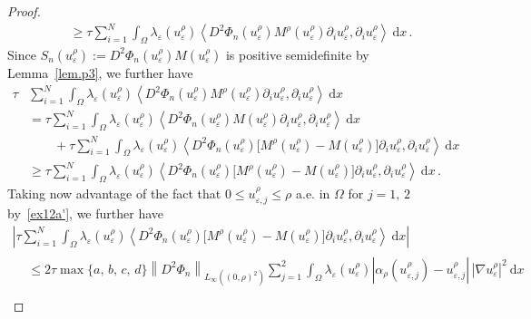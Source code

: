 \documentclass[AHL,Unicode,longabstracts,published]{cedram}
\newcommand{\rmd}{\mathrm{d}}
\begin{document}
\begin{proof}
\begin{equation}
\begin{split}
&\geq \tau \sum_{i=1}^N\int_\Omega\lambda_\varepsilon(u_\varepsilon^\rho) \left\langle D^2\Phi_n(u_\varepsilon^\rho) M^\rho(u_\varepsilon^\rho) \partial_i u_{\varepsilon}^\rho, \partial _i u_\varepsilon^\rho\right\rangle\ \rmd x\,. 
\end{split}
\end{equation}
\endgroup
Since $S_n(u_\varepsilon^\rho) := D^2\Phi_n(u_\varepsilon^\rho) M(u_\varepsilon^\rho)$ is positive semidefinite by Lemma~\ref{lem.p3}, we further have
\begin{equation}\label{pro4}
\begin{split}
\tau &\sum_{i=1}^N\int_\Omega \lambda_\varepsilon(u_\varepsilon^\rho) \left\langle D^2\Phi_n(u_\varepsilon^\rho) M^\rho(u_\varepsilon^\rho) \partial_i u_{\varepsilon}^\rho, \partial _iu_\varepsilon^\rho\right\rangle\ \rmd x\\[1ex]
& = \tau \sum_{i=1}^N\int_\Omega \lambda_\varepsilon(u_\varepsilon^\rho) \left\langle D^2\Phi_n(u_\varepsilon^\rho) M(u_\varepsilon^\rho) \partial_i u_{\varepsilon}^\rho, \partial _iu_\varepsilon^\rho\right\rangle\ \rmd x \\[1ex]
&\qquad + \tau \sum_{i=1}^N\int_\Omega \lambda_\varepsilon(u_\varepsilon^\rho) \left\langle D^2\Phi_n(u_\varepsilon^\rho)\big[M^\rho(u_\varepsilon^\rho) - M(u_\varepsilon^\rho)\big] \partial_i u_{\varepsilon}^\rho, \partial _i u_\varepsilon^\rho\right\rangle\ \rmd x\\[1ex]
&\geq \tau \sum_{i=1}^N\int_\Omega \lambda_\varepsilon(u_\varepsilon^\rho) \left\langle D^2\Phi_n(u_\varepsilon^\rho) \big[M^\rho(u_\varepsilon^\rho) - M(u_\varepsilon^\rho)\big] \partial_i u_{\varepsilon}^\rho, \partial _i u_\varepsilon^\rho\right\rangle\ \rmd x\,. 
\end{split}
\end{equation}
Taking now advantage of the fact that $0 \le u_{\varepsilon,j}^\rho\leq \rho$ a.e. in $\Omega$ for $j=1,\, 2$ by~\eqref{ex12a'}, we further have
\begin{multline*}
\left| \tau \sum_{i=1}^N\int_\Omega \lambda_\varepsilon(u_\varepsilon^\rho) \left\langle D^2\Phi_n(u_\varepsilon^\rho) \big[M^\rho(u_\varepsilon^\rho) - M(u_\varepsilon^\rho)\big] \partial_i u_{\varepsilon}^\rho, \partial _i u_\varepsilon^\rho\right\rangle\ \rmd x\right|\\[1ex]
\begin{aligned}
& \le 2\tau \max\{a,\,b,\,c,\,d\} \left\|D^2\Phi_n\right\|_{L_\infty\left((0,\rho)^2\right)} \sum_{j=1}^2 \int_\Omega \lambda_\varepsilon(u_\varepsilon^\rho) \left|\alpha_\rho\left(u_{\varepsilon,j}^\rho\right) - u_{\varepsilon,j}^\rho\right|\, \left|\nabla u_\varepsilon^\rho\right|^2 \ \rmd x\\[1ex]

\end{aligned}
\end{multline*}
\end{proof}
\end{document}
